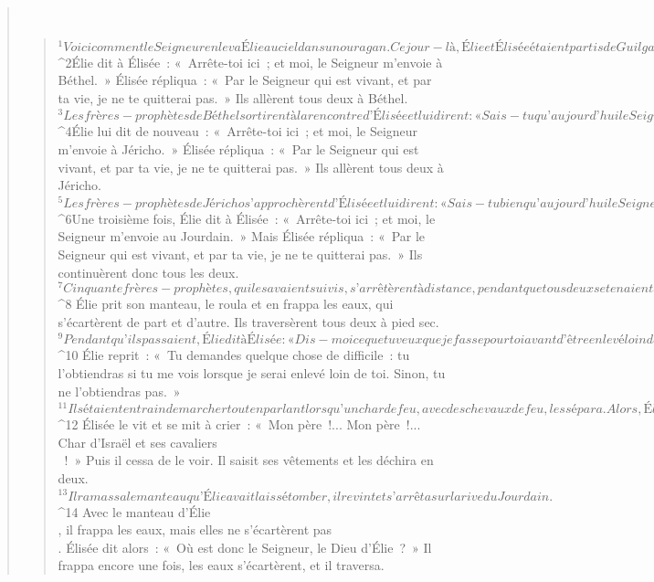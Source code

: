 \begin{verse}
         
      \bchapter{}
      \begin{verse}
${}^{1}Voici comment le Seigneur enleva Élie au ciel dans un ouragan. Ce jour-là, Élie et Élisée étaient partis de Guilgal. 
${}^{2}Élie dit à Élisée : « Arrête-toi ici ; et moi, le Seigneur m’envoie à Béthel. » Élisée répliqua : « Par le Seigneur qui est vivant, et par ta vie, je ne te quitterai pas. » Ils allèrent tous deux à Béthel. 
${}^{3}Les frères-prophètes de Béthel sortirent à la rencontre d’Élisée et lui dirent : « Sais-tu qu’aujourd’hui le Seigneur va enlever ton maître au-dessus de ta tête ? » Élisée répondit : « Oui, je le sais. Taisez-vous ! » 
${}^{4}Élie lui dit de nouveau : « Arrête-toi ici ; et moi, le Seigneur m’envoie à Jéricho. » Élisée répliqua : « Par le Seigneur qui est vivant, et par ta vie, je ne te quitterai pas. » Ils allèrent tous deux à Jéricho. 
${}^{5}Les frères-prophètes de Jéricho s’approchèrent d’Élisée et lui dirent : « Sais-tu bien qu’aujourd’hui le Seigneur va enlever ton maître au-dessus de ta tête ? » Élisée répondit : « Oui, je le sais. Taisez-vous ! » 
${}^{6}Une troisième fois, Élie dit à Élisée : « Arrête-toi ici ; et moi, le Seigneur m’envoie au Jourdain. » Mais Élisée répliqua : « Par le Seigneur qui est vivant, et par ta vie, je ne te quitterai pas. » Ils continuèrent donc tous les deux.
${}^{7}Cinquante frères-prophètes, qui les avaient suivis, s’arrêtèrent à distance, pendant que tous deux se tenaient au bord du Jourdain. 
${}^{8} Élie prit son manteau, le roula et en frappa les eaux, qui s’écartèrent de part et d’autre. Ils traversèrent tous deux à pied sec. 
${}^{9} Pendant qu’ils passaient, Élie dit à Élisée : « Dis-moi ce que tu veux que je fasse pour toi avant d’être enlevé loin de toi. » Élisée répondit : « Que je reçoive une double part de l’esprit que tu as reçu ! » 
${}^{10} Élie reprit : « Tu demandes quelque chose de difficile : tu l’obtiendras si tu me vois lorsque je serai enlevé loin de toi. Sinon, tu ne l’obtiendras pas. » 
${}^{11} Ils étaient en train de marcher tout en parlant lorsqu’un char de feu, avec des chevaux de feu, les sépara. Alors, Élie monta au ciel dans un ouragan. 
${}^{12} Élisée le vit et se mit à crier : « Mon père !... Mon père !... Char d’Israël et ses cavaliers\\ ! » Puis il cessa de le voir. Il saisit ses vêtements et les déchira en deux. 
${}^{13} Il ramassa le manteau qu’Élie avait laissé tomber, il revint et s’arrêta sur la rive du Jourdain. 
${}^{14} Avec le manteau d’Élie\\, il frappa les eaux, mais elles ne s’écartèrent pas\\. Élisée dit alors : « Où est donc le Seigneur, le Dieu d’Élie ? » Il frappa encore une fois, les eaux s’écartèrent, et il traversa.

\end{verse}
\end{verse}
